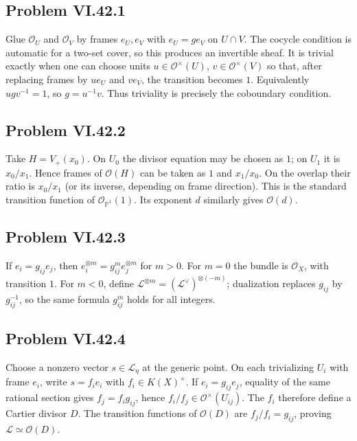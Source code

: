 \subsection*{Problem VI.42.1}
\begin{solution}
Glue \(\mathcal O_U\) and \(\mathcal O_V\) by frames \(e_U,e_V\) with \(e_U=ge_V\) on \(U\cap V\).  The cocycle condition is automatic for a two-set cover, so this produces an invertible sheaf.  It is trivial exactly when one can choose units \(u\in\mathcal O^\times(U)\), \(v\in\mathcal O^\times(V)\) so that, after replacing frames by \(u e_U\) and \(v e_V\), the transition becomes \(1\).  Equivalently \(u g v^{-1}=1\), so \(g=u^{-1}v\).  Thus triviality is precisely the coboundary condition.
\end{solution}

\subsection*{Problem VI.42.2}
\begin{solution}
Take \(H=V_+(x_0)\).  On \(U_0\) the divisor equation may be chosen as \(1\); on \(U_1\) it is \(x_0/x_1\).  Hence frames of \(\mathcal O(H)\) can be taken as \(1\) and \(x_1/x_0\).  On the overlap their ratio is \(x_0/x_1\) (or its inverse, depending on frame direction).  This is the standard transition function of \(\mathcal O_{\mathbb P^1}(1)\).  Its exponent \(d\) similarly gives \(\mathcal O(d)\).
\end{solution}

\subsection*{Problem VI.42.3}
\begin{solution}
If \(e_i=g_{ij}e_j\), then \(e_i^{\otimes m}=g_{ij}^m e_j^{\otimes m}\) for \(m>0\).  For \(m=0\) the bundle is \(\mathcal O_X\), with transition \(1\).  For \(m<0\), define \(\mathcal L^{\otimes m}=(\mathcal L^\vee)^{\otimes(-m)}\); dualization replaces \(g_{ij}\) by \(g_{ij}^{-1}\), so the same formula \(g_{ij}^m\) holds for all integers.
\end{solution}

\subsection*{Problem VI.42.4}
\begin{solution}
Choose a nonzero vector \(s\in\mathcal L_\eta\) at the generic point.  On each trivializing \(U_i\) with frame \(e_i\), write \(s=f_i e_i\) with \(f_i\in K(X)^\times\).  If \(e_i=g_{ij}e_j\), equality of the same rational section gives \(f_j=f_i g_{ij}\), hence \(f_i/f_j\in\mathcal O^\times(U_{ij})\).  The \(f_i\) therefore define a Cartier divisor \(D\).  The transition functions of \(\mathcal O(D)\) are \(f_j/f_i=g_{ij}\), proving \(\mathcal L\simeq\mathcal O(D)\).
\end{solution}

